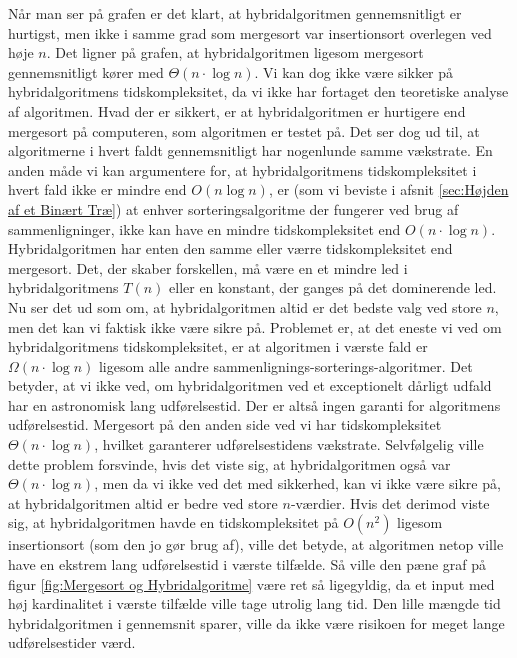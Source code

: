 Når man ser på grafen er det klart, at hybridalgoritmen gennemsnitligt er hurtigst, men ikke i samme grad som mergesort var insertionsort overlegen ved høje $n$. Det ligner på grafen, at hybridalgoritmen ligesom mergesort gennemsnitligt kører med $\Theta (n \cdot \log n)$. Vi kan dog ikke være sikker på hybridalgoritmens tidskompleksitet, da vi ikke har fortaget den teoretiske analyse af algoritmen. Hvad der er sikkert, er at hybridalgoritmen er hurtigere end mergesort på computeren, som algoritmen er testet på. Det ser dog ud til, at algoritmerne i hvert faldt gennemsnitligt har nogenlunde samme vækstrate. En anden måde vi kan argumentere for, at hybridalgoritmens tidskompleksitet i hvert fald ikke er mindre end $O(n \log n)$, er (som vi beviste i afsnit \ref{sec:Højden af et Binært Træ}) at enhver sorteringsalgoritme der fungerer ved brug af sammenligninger, ikke kan have en mindre tidskompleksitet end $O(n \cdot \log n)$. Hybridalgoritmen har enten den samme eller værre tidskompleksitet end mergesort. Det, der skaber forskellen, må være en et mindre led i hybridalgoritmens $T(n)$ eller en konstant, der ganges på det dominerende led.\\

Nu ser det ud som om, at hybridalgoritmen altid er det bedste valg ved store $n$, men det kan vi faktisk ikke være sikre på. Problemet er, at det eneste vi ved om hybridalgoritmens tidskompleksitet, er at algoritmen i værste fald er $\Omega (n \cdot \log n)$ ligesom alle andre sammenlignings-sorterings-algoritmer. Det betyder, at vi ikke ved, om hybridalgoritmen ved et exceptionelt dårligt udfald har en astronomisk lang udførelsestid. Der er altså ingen garanti for algoritmens udførelsestid. Mergesort på den anden side ved vi har tidskompleksitet $\Theta (n \cdot \log n)$, hvilket garanterer udførelsestidens vækstrate. Selvfølgelig ville dette problem forsvinde, hvis det viste sig, at hybridalgoritmen også var $\Theta (n \cdot \log n)$, men da vi ikke ved det med sikkerhed, kan vi ikke være sikre på, at hybridalgoritmen altid er bedre ved store $n$-værdier. Hvis det derimod viste sig, at hybridalgoritmen havde en tidskompleksitet på $O(n^2)$ ligesom insertionsort (som den jo gør brug af), ville det betyde, at algoritmen netop ville have en ekstrem lang udførelsestid i værste tilfælde. Så ville den pæne graf på figur \ref{fig:Mergesort og Hybridalgoritme} være ret så ligegyldig, da et input med høj kardinalitet i værste tilfælde ville tage utrolig lang tid. Den lille mængde tid hybridalgoritmen i gennemsnit sparer, ville da ikke være risikoen for meget lange udførelsestider værd.

